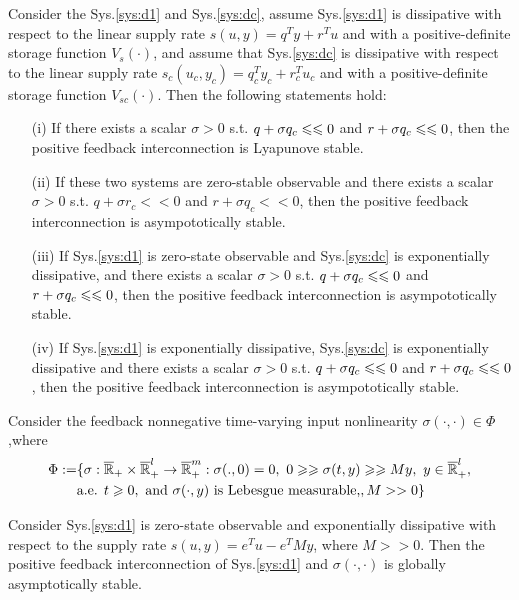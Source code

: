 \documentclass{paper}
\begin{document}
\begin{thm}
Consider the Sys.\ref{sys:d1} and Sys.\ref{sys:dc}, assume Sys.\ref{sys:d1} is dissipative with respect to the linear supply rate
$s(u,y)=q^Ty+r^Tu$ and with a positive-definite storage function $V_s(\cdot)$, and assume that Sys.\ref{sys:dc} is dissipative 
with respect to the linear supply rate $s_c(u_c,y_c)=q_c^Ty_c+r_c^Tu_c$ and with a positive-definite storage function $V_{sc}(\cdot)$.
Then the following statements hold:
\begin{enumerate}
\item[(i)]   If there exists a scalar $\sigma>0$ s.t. $q+\sigma q_c\leqslant\leqslant 0$ and $r+\sigma q_c\leqslant\leqslant 0$, then the positive feedback interconnection
is Lyapunove stable.
\item[(ii)]  If these two systems are zero-stable observable and there exists a scalar $\sigma>0$ s.t. $q+\sigma r_c<<0$ and 
$r+\sigma q_c<<0$, then the positive feedback interconnection is asympototically stable.
\item[(iii)] If Sys.\ref{sys:d1} is zero-state observable and Sys.\ref{sys:dc} is exponentially dissipative, and there exists 
a scalar $\sigma>0$ s.t. $q+\sigma q_c\leqslant\leqslant 0$ and $r+\sigma q_c\leqslant\leqslant 0$, then the positive feedback interconnection is asympototically stable.
\item[(iv)]  If Sys.\ref{sys:d1} is exponentially dissipative, Sys.\ref{sys:dc} is exponentially dissipative and there exists 
a scalar $\sigma>0$ s.t. $q+\sigma q_c\leqslant\leqslant 0$ and $r+\sigma q_c\leqslant\leqslant 0$, then the positive feedback interconnection is asympototically stable.
\end{enumerate}
\end{thm}
Consider the feedback nonnegative time-varying input nonlinearity $\sigma(\cdot,\cdot)\in\Phi$,where
\begin{align}
\Phi:=&\lbrace\sigma:\overline{\mathbb{R}}_{+}\times\overline{\mathbb{R}}_{+}^l\rightarrow \overline{\mathbb{R}}_{+}^m: 
\sigma(.,0)=0,\text{ }0\geqslant\geqslant\sigma(t,y)\geqslant\geqslant My,\text{ } y\in\overline{\mathbb{R}}_{+}^l, \nonumber \\
\qquad &\text{a.e. } t\geqslant 0, \text{ and } \sigma(\cdot,y) \text{ is Lebesgue measurable,}, M>>0 \rbrace
\end{align}
\begin{thm}
Consider Sys.\ref{sys:d1} is zero-state observable and exponentially dissipative with respect to the supply rate $s(u,y)=e^Tu-e^TMy$, where
$M>>0$. Then the positive feedback interconnection of Sys.\ref{sys:d1} and $\sigma(\cdot,\cdot)$ is globally asymptotically stable.
\end{thm}
\end{document}
